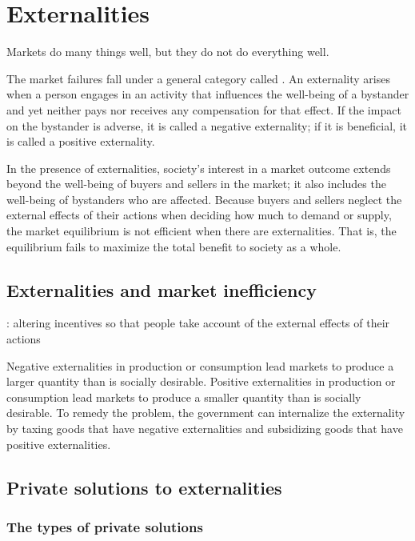 
\chapter{Externalities}

Markets do many things well, but they do not do everything well.

The market failures fall under a general category called .
An externality arises when a person engages in an activity that influences the well-being of a bystander and yet neither pays nor receives any compensation for that effect.
If the impact on the bystander is adverse, it is called a negative externality; if it is beneficial, it is called a positive externality.



In the presence of externalities, society’s interest in a market outcome extends beyond the well-being of buyers and sellers in the market; it also includes the well-being of bystanders who are affected. Because buyers and sellers neglect the external effects of their actions when deciding how much to demand or supply, the market equilibrium is not efficient when there are externalities. That is, the equilibrium fails to maximize the total benefit to society as a whole.



\section{Externalities and market inefficiency}

:
altering incentives so that people take account of the external effects of their actions




Negative externalities in production or consumption lead markets to produce a larger quantity than is socially desirable. Positive externalities in production or consumption lead markets to produce a smaller quantity than is socially desirable. To remedy the problem, the government can internalize the externality by taxing goods that have negative externalities and subsidizing goods that have positive externalities.



\section{Private solutions to externalities}

\subsection{The types of private solutions}


